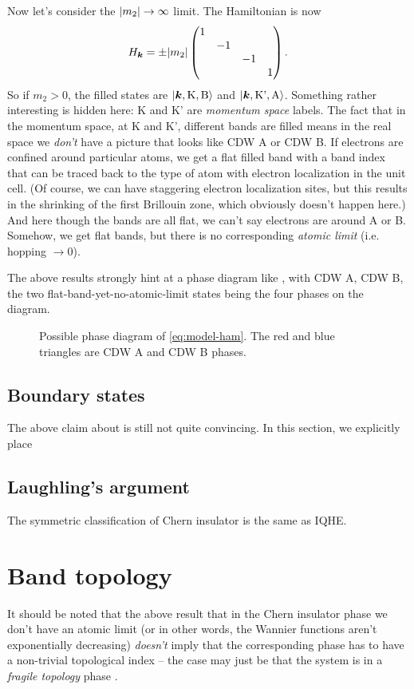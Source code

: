 \documentclass[hyperref, a4paper]{article}
\begin{document}
Now let's consider the $\abs{m_2} \to \infty$ limit.
The Hamiltonian is now 
\begin{equation}
    H_{\vb*{k}} = \pm \abs{m_2} \pmqty{\dmat{1, -1, -1, 1}}.
\end{equation}
So if $m_2 > 0$, the filled states are $\ket{\vb*{k}, \text{K}, \text{B}}$
and $\ket{\vb*{k}, \text{K'}, \text{A}}$.
Something rather interesting is hidden here:
K and K' are \emph{momentum space} labels.
The fact that in the momentum space,
at K and K',
different bands are filled 
means in the real space we \emph{don't} have a picture that looks like CDW A or CDW B.
If electrons are confined around particular atoms,
we get a flat filled band
with a band index that can be traced back to the type of atom with electron localization in the unit cell.
(Of course, we can have staggering electron localization sites,
but this results in the shrinking of the first Brillouin zone,
which obviously doesn't happen here.)
And here though the bands are all flat,
we can't say electrons are around A or B.
Somehow, we get flat bands,
but there is no corresponding \emph{atomic limit} (i.e. hopping $\to 0$).

The above results strongly hint at a phase diagram like ,
with CDW A, CDW B, the two flat-band-yet-no-atomic-limit states 
being the four phases on the diagram.

\begin{figure}
    \centering
    
    \caption{Possible phase diagram of \eqref{eq:model-ham}. The red and blue triangles are CDW A and CDW B phases.}
    \label{fig:possible-phase-1}
\end{figure}

\subsection{Boundary states}

The above claim about  is still not quite convincing.
In this section, 
we explicitly place

\subsection{Laughling's argument}

The symmetric classification of Chern insulator is the same as IQHE.

\section{Band topology}

It should be noted that the above result that in the Chern insulator phase
we don't have an atomic limit 
(or in other words, the Wannier functions aren't exponentially decreasing)
\emph{doesn't} imply that the corresponding phase 
has to have a non-trivial topological index
-- the case may just be that the system is in a \emph{fragile topology} phase
\cite{po_fragile_2018}.



\end{document}
